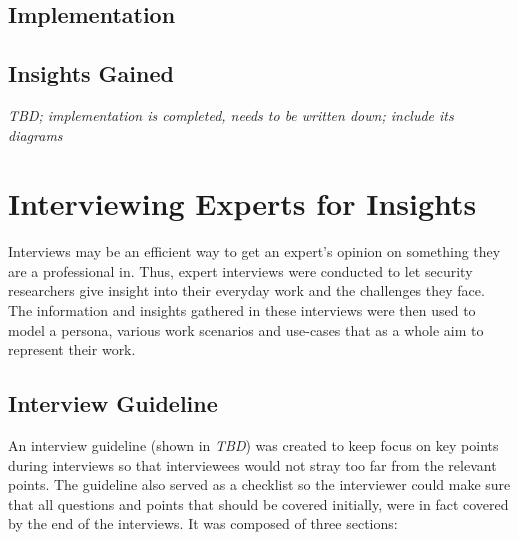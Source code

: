 \subsection{Implementation}

\subsection{Insights Gained}






\emph{TBD; implementation is completed, needs to be written down; include its diagrams} %

\section{Interviewing Experts for Insights}
\label{sec:interviews}
Interviews may be an efficient way to get an expert’s opinion on something they are a professional in. Thus, expert interviews were conducted to let security researchers give insight into their everyday work and the challenges they face. The information and insights gathered in these interviews were then used to model a persona, various work scenarios and use-cases that as a whole aim to represent their work.

\subsection{Interview Guideline}
An interview guideline (shown in \emph{TBD}) %
was created to keep focus on key points during interviews so that interviewees would not stray too far from the relevant points. The guideline also served as a checklist so the interviewer could make sure that all questions and points that should be covered  initially, were in fact covered by the end of the interviews. It was composed of three sections:

